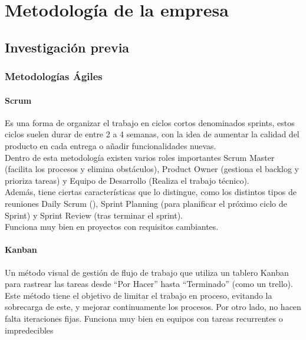 \chapter{Metodología de la empresa}

\section{Investigación previa}

\subsection{Metodologías Ágiles}

\subsubsection{Scrum}

Es una forma de organizar el trabajo en ciclos cortos denominados sprints, estos ciclos suelen durar de entre 2 a 4 semanas, con la idea de aumentar la calidad del producto en cada entrega o añadir funcionalidades nuevas.\\

Dentro de esta metodología existen varios roles importantes Scrum Master (facilita los procesos y elimina obstáculos), Product Owner (gestiona el backlog y prioriza tareas) y Equipo de Desarrollo (Realiza el trabajo técnico).\\

Además, tiene ciertas características que lo distingue, como los distintos tipos de reuniones Daily Scrum (), Sprint Planning (para planificar el próximo ciclo de Sprint) y Sprint Review (tras terminar el sprint).\\

Funciona muy bien en proyectos con requisitos cambiantes.

\subsubsection{Kanban}

Un método visual de gestión de flujo de trabajo que utiliza un tablero Kanban para rastrear las tareas desde “Por Hacer” hasta “Terminado” (como un trello). Este método tiene el objetivo de limitar el trabajo en proceso, evitando la sobrecarga de este, y mejorar continuamente los procesos. Por otro lado, no hacen falta iteraciones fijas. Funciona muy bien en equipos con tareas recurrentes o impredecibles

